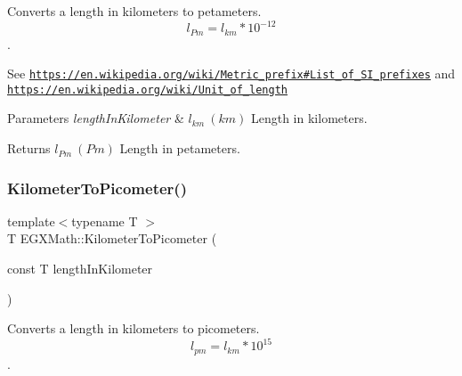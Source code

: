 Converts a length in kilometers to petameters. \[ l_{Pm}=l_{km} * 10^{-12} \]. 

See \href{https://en.wikipedia.org/wiki/Metric_prefix#List_of_SI_prefixes}{\tt https\+://en.\+wikipedia.\+org/wiki/\+Metric\+\_\+prefix\#\+List\+\_\+of\+\_\+\+S\+I\+\_\+prefixes} and \href{https://en.wikipedia.org/wiki/Unit_of_length}{\tt https\+://en.\+wikipedia.\+org/wiki/\+Unit\+\_\+of\+\_\+length} 
\begin{DoxyParams}{Parameters}
{\em length\+In\+Kilometer} & $ l_{km}\ (km)$ Length in kilometers. \\
\hline
\end{DoxyParams}
\begin{DoxyReturn}{Returns}
$ l_{Pm}\ (Pm)$ Length in petameters. 
\end{DoxyReturn}
\mbox{\label{group___e_g_x_math-_conversions-_length_conversions-_s_i-_kilometer-_s_i_ga73f6e033de3c41892f06cde1862f68d6}} 
\subsubsection{\texorpdfstring{Kilometer\+To\+Picometer()}{KilometerToPicometer()}}
{\footnotesize\ttfamily template$<$typename T $>$ \\
T E\+G\+X\+Math\+::\+Kilometer\+To\+Picometer (\begin{DoxyParamCaption}\item[{const T}]{length\+In\+Kilometer }\end{DoxyParamCaption})}



Converts a length in kilometers to picometers. \[ l_{pm}=l_{km} * 10^{15} \]. 

